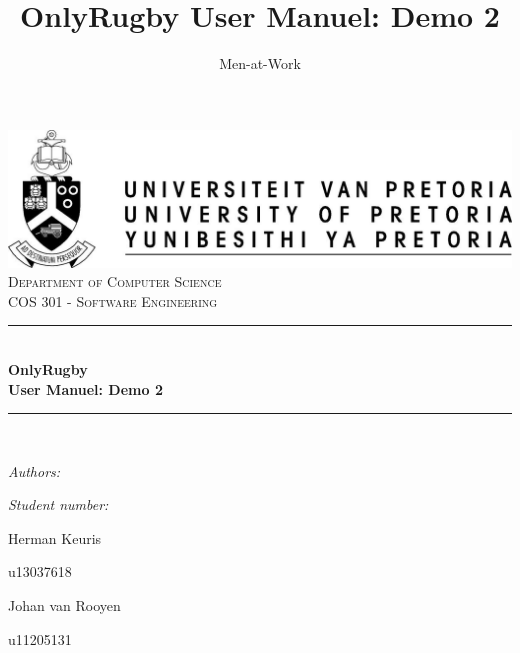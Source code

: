 \documentclass[hidelinks,a4paper,12pt]{article}
\author{Men-at-Work}
\title{ OnlyRugby User Manuel: Demo 2}
\newcommand{\HRule}{\rule{\linewidth}{0.5mm}}
\begin{document}
\setlength{\parskip}{6pt}

\begin{titlepage}

\begin{center}
\includegraphics[width=1\textwidth]{./up-logo.jpg}\\[0.4cm]    
\textsc{\LARGE Department of Computer Science}\\[1.5cm]
\textsc{\Large COS 301 - Software Engineering}\\[0.5cm]
\HRule \\[0.4cm]
{ \huge \bfseries OnlyRugby\\User Manuel: Demo 2}\\[0.4cm]
\HRule \\[0.4cm]
\begin{minipage}{0.4\textwidth}
\begin{flushleft} \large
\emph{Authors:}
\end{flushleft}
\end{minipage}
\begin{minipage}{0.4\textwidth}
\begin{flushright} \large
\emph{Student number:}
\end{flushright}
\end{minipage}

\begin{minipage}{0.4\textwidth}
\begin{flushleft} \large
Herman {Keuris}
\end{flushleft}
\end{minipage}
\begin{minipage}{0.4\textwidth}
\begin{flushright} \large
\emph{}
u13037618
\end{flushright}
\end{minipage}

\begin{minipage}{0.4\textwidth}
\begin{flushleft} \large
Johan {van Rooyen}
\end{flushleft}
\end{minipage}
\begin{minipage}{0.4\textwidth}
\begin{flushright} \large
\emph{}
u11205131
\end{flushright}
\end{minipage}


\end{center}
\end{titlepage}
\end{document}
